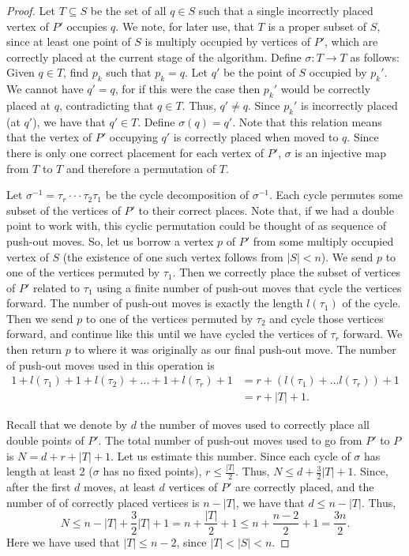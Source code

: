 \documentclass[11pt]{amsart}
\theoremstyle{remark}
\numberwithin{equation}{section}
\renewcommand{\leq}{\leqslant}
\begin{document}
\begin{proof}
Let $T\subseteq S$ be the set of all $q\in S$ such that a single incorrectly placed vertex of $P'$ occupies $q$. 
We note, for later use, that  $T$ is a proper subset of $S$, since at least one point of $S$ is multiply occupied by vertices of $P'$, which are correctly placed at the current stage of the algorithm.
Define $\sigma\colon T \to T$ as follows: Given $q\in T$, find $p_k$ such that $p_k=q$.  Let $q'$ be the point of $S$ occupied by  $p_k'$. We cannot have $q'=q$, for if this were the case then $p_k'$ would be correctly placed at $q$, contradicting that $q\in T$.
Thus, $q'\neq q$. Since $p_k'$ is incorrectly placed (at $q'$), we have that $q'\in T$. Define $\sigma(q)=q'$. Note that this relation means that the vertex of $P'$ occupying $q'$ is correctly placed when moved to $q$.  Since there is only one correct placement for each vertex of $P'$, $\sigma$ is an injective map from $T$ to $T$ and therefore a permutation of $T$. 


Let $\sigma^{-1}=\tau_r\cdot\cdot\cdot\tau_2\tau_1$ be the cycle decomposition of $\sigma^{-1}$. Each cycle permutes some subset of the vertices of $P'$ to their correct places. Note that, if we had a double point to work with, this cyclic permutation could be thought of as sequence of push-out moves. So, let us  borrow a vertex  $p$ of $P'$ from some multiply occupied vertex of $S$ (the existence of one such vertex follows from $|S|<n$). We send $p$ to one of the vertices permuted by $\tau_1$. Then we correctly place the subset of vertices of $P'$ related to $\tau_1$ using a finite number of push-out moves that cycle the vertices forward. The number of push-out moves is exactly the length $l(\tau_1)$ of the cycle. Then we send $p$ to one of the vertices permuted by $\tau_2$ and cycle those vertices forward, and continue like this until we have cycled the vertices of $\tau_r$ forward. We then return $p$ to where it was originally as our final push-out move.  The number of push-out moves used in this operation is 
\begin{align*} 
1+l(\tau_1)+1+l(\tau_2)+...+1+l(\tau_r)+1 &= r+ (l(\tau_1)+...l(\tau_r))+1 \\
& = r+|T|+1.
\end{align*}

Recall that we denote by $d$ the number of moves used to correctly place all double points of $P'$. 
The total number of push-out moves used to go from $P'$ to $P$ is $N=d+r+|T|+1$. Let us estimate this number.
Since each cycle of $\sigma$ has length at least 2 ($\sigma$ has no fixed points), $r\leq \frac{|T|}{2}$. 
Thus, $N\leq d + \frac{3}{2}|T| + 1$.
Since, after the first $d$ moves, at least $d$ vertices of $P'$ are correctly placed,
and the number of of correctly placed vertices is $n-|T|$,  we have  that
$d\leq n-|T|$.
Thus,
\[
N\leq n-|T|+ \frac{3}{2}|T| + 1=n+ \frac{|T|}{2}+1\leq n+\frac{n-2}{2}+1=\frac{3n}{2}.
\]
Here we have used that  $|T|\leq n-2$, since $|T|< |S|<n$.
\end{proof}
\end{document}

